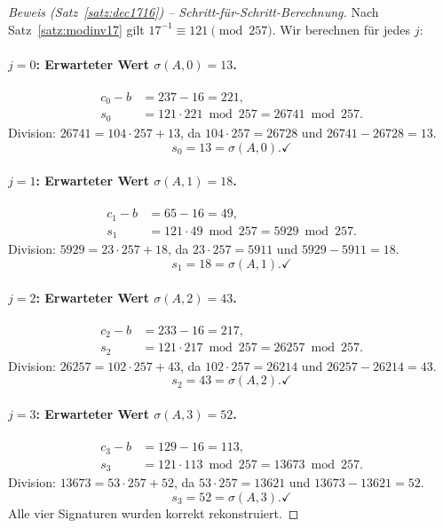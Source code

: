 ﻿\documentclass[a4paper,12pt]{scrreprt}
\theoremstyle{definition}
\begin{document}
\begin{proof}[Beweis (Satz~\ref{satz:dec1716}) -- Schritt-für-Schritt-Berechnung]
Nach Satz~\ref{satz:modinv17} gilt $17^{-1} \equiv 121 \pmod{257}$. Wir berechnen für jedes $j$:

\paragraph{$j = 0$: Erwarteter Wert $\sigma(A,0) = 13$.}
\begin{align*}
c_0 - b &= 237 - 16 = 221, \\
s_0 &= 121 \cdot 221 \bmod 257 = 26741 \bmod 257.
\end{align*}
Division: $26741 = 104 \cdot 257 + 13$, da $104 \cdot 257 = 26728$ und $26741 - 26728 = 13$.
\[
s_0 = 13 = \sigma(A,0). \checkmark
\]

\paragraph{$j = 1$: Erwarteter Wert $\sigma(A,1) = 18$.}
\begin{align*}
c_1 - b &= 65 - 16 = 49, \\
s_1 &= 121 \cdot 49 \bmod 257 = 5929 \bmod 257.
\end{align*}
Division: $5929 = 23 \cdot 257 + 18$, da $23 \cdot 257 = 5911$ und $5929 - 5911 = 18$.
\[
s_1 = 18 = \sigma(A,1). \checkmark
\]

\paragraph{$j = 2$: Erwarteter Wert $\sigma(A,2) = 43$.}
\begin{align*}
c_2 - b &= 233 - 16 = 217, \\
s_2 &= 121 \cdot 217 \bmod 257 = 26257 \bmod 257.
\end{align*}
Division: $26257 = 102 \cdot 257 + 43$, da $102 \cdot 257 = 26214$ und $26257 - 26214 = 43$.
\[
s_2 = 43 = \sigma(A,2). \checkmark
\]

\paragraph{$j = 3$: Erwarteter Wert $\sigma(A,3) = 52$.}
\begin{align*}
c_3 - b &= 129 - 16 = 113, \\
s_3 &= 121 \cdot 113 \bmod 257 = 13673 \bmod 257.
\end{align*}
Division: $13673 = 53 \cdot 257 + 52$, da $53 \cdot 257 = 13621$ und $13673 - 13621 = 52$.
\[
s_3 = 52 = \sigma(A,3). \checkmark
\]
Alle vier Signaturen wurden korrekt rekonstruiert.
\end{proof}
\end{document}
